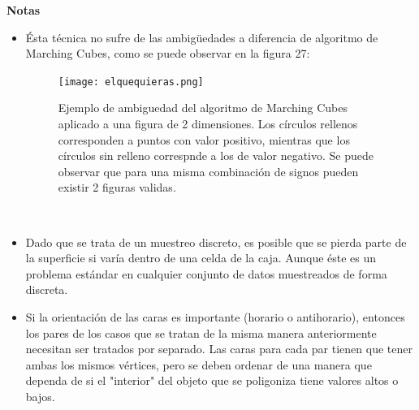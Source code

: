 \documentclass[12pt]{article}
\begin{document}
\textbf{Notas}
\begin{itemize}
\item Ésta técnica no sufre de las ambigüedades a diferencia de algoritmo de Marching Cubes, como se puede observar en la figura 27:
\begin{figure}[h!]
\texttt{[image: elquequieras.png]}
\caption{Ejemplo de ambiguedad del algoritmo de Marching Cubes aplicado a una figura de 2 dimensiones. Los círculos rellenos corresponden a puntos con valor positivo, mientras que los círculos sin relleno correspnde a los de valor negativo. Se puede observar que para una misma combinación de signos pueden existir 2 figuras validas.}
\end{figure}\\
\item Dado que se trata de un muestreo discreto, es posible que se pierda parte de la superficie si varía dentro de una celda de la caja. Aunque éste es un problema estándar en cualquier conjunto de datos muestreados de forma discreta.
\item Si la orientación de las caras es importante (horario o antihorario), entonces los pares de los casos que se tratan de la misma manera anteriormente necesitan ser tratados por separado. Las caras para cada par tienen que tener ambas los mismos vértices, pero se deben ordenar de una manera que dependa de si el "interior" del objeto que se poligoniza tiene valores altos o bajos.
\end{itemize}
\end{document}
